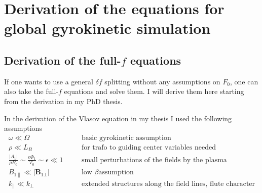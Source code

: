 \chapter{Derivation of the equations for global gyrokinetic
  simulation}
\label{sec:globaleq}

\section{Derivation of the full-$f$ equations}
\label{sec:fullfeq}

If one wants to use a general $\delta f$ splitting without any
assumptions on $F_0$, one can also take the full-$f$ equations and
solve them. I will derive them here starting from the derivation in my
PhD thesis.

In the derivation of the Vlasov equation in my thesis I used the
following assumptions
\begin{eqnarray*}
  \omega\ll\Omega&\quad&\mbox{basic gyrokinetic assumption}\\
  \rho\ll L_B&\quad&\mbox{for trafo to guiding center variables
    needed}\\
  \frac{|A_1|}{\rho B_0}\sim\frac{e\Phi_1}{T_0}\sim\epsilon\ll 1&\quad&\mbox{small perturbations of the fields by the plasma}\\
  B_{1\|}\ll |\mathbf{B}_{1\bot}|&\quad&\mbox{low $\beta$
    assumption}\\
  k_\|\ll k_\bot&\quad&\mbox{extended structures along the field
    lines, flute character}
\end{eqnarray*}


